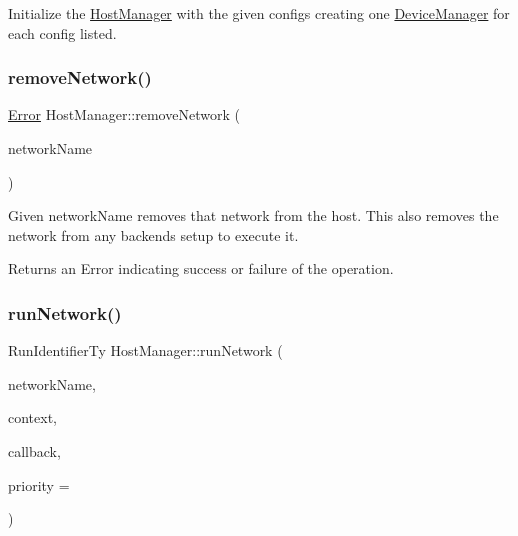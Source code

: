 Initialize the \hyperlink{classglow_1_1runtime_1_1_host_manager}{Host\+Manager} with the given {\ttfamily configs} creating one \hyperlink{classglow_1_1runtime_1_1_device_manager}{Device\+Manager} for each config listed. \mbox{\label{classglow_1_1runtime_1_1_host_manager_a3ab032d13b46dad18341e97cec4a46c6}} 
\subsubsection{\texorpdfstring{remove\+Network()}{removeNetwork()}}
{\footnotesize\ttfamily \hyperlink{namespaceglow_afdb176c3a672ef66db0ecfc19a8d39bf}{Error} Host\+Manager\+::remove\+Network (\begin{DoxyParamCaption}\item[{llvm\+::\+String\+Ref}]{network\+Name }\end{DoxyParamCaption})}

Given {\ttfamily network\+Name} removes that network from the host. This also removes the network from any backends setup to execute it. \begin{DoxyReturn}{Returns}
an Error indicating success or failure of the operation. 
\end{DoxyReturn}
\mbox{\label{classglow_1_1runtime_1_1_host_manager_a40bb5ba6c62b6697e306519271b3b936}} 
\subsubsection{\texorpdfstring{run\+Network()}{runNetwork()}}
{\footnotesize\ttfamily Run\+Identifier\+Ty Host\+Manager\+::run\+Network (\begin{DoxyParamCaption}\item[{llvm\+::\+String\+Ref}]{network\+Name,  }\item[{std\+::unique\+\_\+ptr$<$ \hyperlink{classglow_1_1_execution_context}{Execution\+Context} $>$}]{context,  }\item[{Result\+C\+B\+Ty}]{callback,  }\item[{uint64\+\_\+t}]{priority = {} }\end{DoxyParamCaption})}

